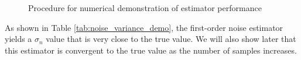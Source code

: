 \begin{figure}[!h]
    \centering
    \caption{Procedure for numerical demonstration of estimator performance}
    \label{fig:noise_variance_demo_procedure}
\end{figure}

As shown in Table \ref{tab:noise_variance_demo}, the first-order noise estimator yields a $\sigma_n$ value that is very close to the true value. We will also show later that this estimator is convergent to the true value as the number of samples increases.


